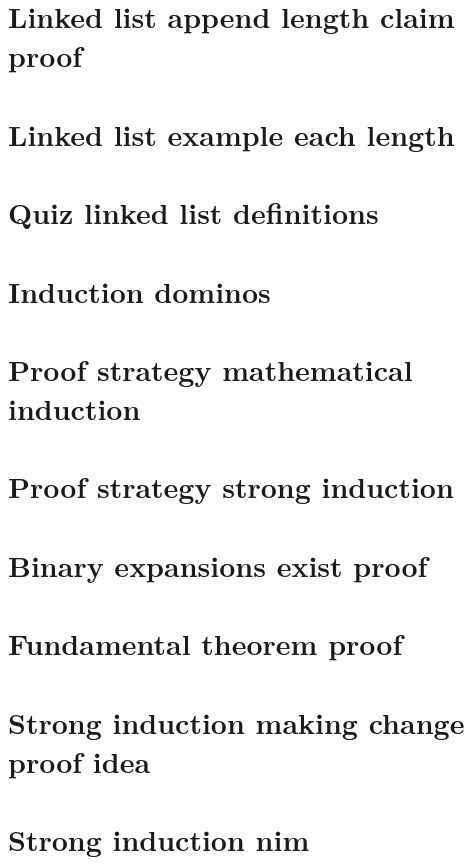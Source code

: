 \section*{Linked list append length claim proof}

\vfill
\section*{Linked list example each length}

\vfill
\section*{Quiz linked list definitions}

\vfill
\section*{Induction dominos}

\vfill
\section*{Proof strategy mathematical induction}

\vfill
\section*{Proof strategy strong induction}

\vfill
\section*{Binary expansions exist proof}

\vfill
\section*{Fundamental theorem proof}

\vfill
\section*{Strong induction making change proof idea}

\vfill
\section*{Strong induction nim}

\vfill
